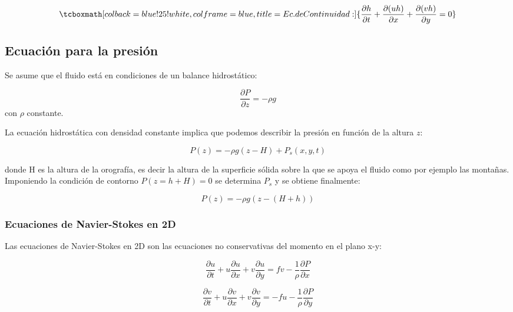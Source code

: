 \documentclass[12pt,dvipsnames]{exam}
\begin{document}
\begin{equation*}
\tcboxmath[colback=blue!25!white,colframe=blue, title=Ec. de Continuidad:]{
    \frac{\partial h}{\partial t} + \frac{\partial (u h)}{\partial x} + \frac{\partial (v h)}{\partial y} = 0 }
\end{equation*}

\subsection{Ecuación para la presión}

Se asume que el fluido está en condiciones de un balance hidrostático:

\begin{equation*}
    \frac{\partial P}{\partial z} = - \rho g
\end{equation*}
con $\rho$ constante.

La ecuación hidrostática con densidad constante implica que podemos describir la presión en función de la altura $z$:

\begin{equation*}
    P(z) = - \rho g (z - H) + P_{s}(x,y,t)
\end{equation*}

donde H es la altura de la orografía, es decir la altura de la superficie sólida sobre la que se apoya el fluido como por ejemplo las montañas. Imponiendo la condición de contorno $P(z = h + H) = 0$ se determina $P_{s}$ y se obtiene finalmente:

\begin{equation}
P(z) = - \rho g (z - (H + h))    
\label{eq:pp}
\end{equation}

\subsubsection{Ecuaciones de Navier-Stokes en 2D}
Las ecuaciones de Navier-Stokes en 2D son las ecuaciones no conservativas del momento en el plano x-y:

\begin{equation}
    \frac{\partial u}{\partial t} + u \frac{\partial u}{\partial x} + v \frac{\partial u}{\partial y} = f v - \frac{1}{\rho} \frac{\partial P}{\partial x}
    \label{nc1}
\end{equation}

\begin{equation}
        \frac{\partial v}{\partial t} + u \frac{\partial v}{\partial x} + v \frac{\partial v}{\partial y} = -f u - \frac{1}{\rho} \frac{\partial P}{\partial y}
        \label{nc2}
\end{equation}
\end{document}
